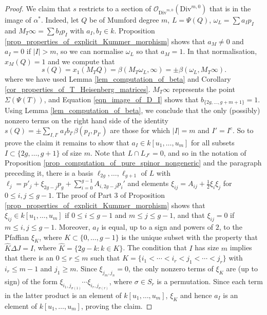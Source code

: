 \documentclass{article} %
\numberwithin{equation}{section}
\newcommand{\cO}{\mathcal{O}}
\begin{document}
\begin{proof}
We claim that $s$ restricts to a section of $\cO_{\mathrm{Div}^{m,0}}(\mathrm{Div}^{m,0})$ that is in the image of $\alpha^\ast$.
Indeed, let $Q$ be of Mumford degree $m$, $L = \Psi(Q)$,  $\omega_L = \sum a_I p_I$ and $M_T\infty = \sum b_I p_I$ with $a_I, b_I \in k$.
Proposition \ref{prop_properties_of_explicit_Kummer_morphism} shows that $a_M\neq0$ and $a_I=0$ if $|I|>m$, so we can normalise $\omega_L$ so that $a_M = 1$.
In that normalisation, $x_M(Q)=1$ and we compute that 
\[ s(Q) = x_1(M_TQ) = \beta(M_T\omega_L, \infty) = \pm \beta(\omega_L, M_T\infty). \]
where we have used Lemma \ref{lem_computation_of_beta} and Corollary \ref{cor_properties_of_T_Heisenberg_matrices}. $M_T  \infty$ represents the point $\Sigma(\Psi(T))$, and Equation \eqref{eqn_image_of_D_I} shows that $b_{\{2g, \dots, g+m+1\}}=1$.
Using Lemma \ref{lem_computation_of_beta}, we conclude that the only (possibly) nonzero terms on the right hand side of the identity
$s(Q) = \pm\sum_{I,I'} a_I b_{I'} \beta(p_I, p_{I'})$ are those for which $|I| = m$ and $I' = I^c$.
So to prove the claim it remains to show that $a_I \in k[u_1, \dots, u_m]$ for all subsets $I\subset \{2g, \dots, g+1\}$ of size $m$. 
Note that $L \cap L_{J^c} = 0$, and so in the notation of Proposition \ref{prop_computation_of_pure_spinor_nongeneric} and the paragraph preceding it, there is a basis $\ell_{2g}, \dots, \ell_{g+1}$ of $L$ with $\ell_j = p'_j + \xi_{2g-j} p_g + \sum_{i=0}^{g-1} A_{i ,2g-j} p_i'$ and elements $\xi_{ij} = A_{ij} +\frac{1}{2} \xi_i \xi_j$ for $0\leq i,j\leq g-1$.
The proof of Part  3 of Proposition \ref{prop_properties_of_explicit_Kummer_morphism} shows that $\xi_{ij}\in k[u_1, \dots, u_m]$ if $0\leq i \leq g-1$ and $m\leq j\leq g-1$, and that $\xi_{ij} =0$ if $m\leq i,j\leq g-1$. 
Moreover, $a_I$ is equal, up to a sign and powers of $2$, to the Pfaffian $\xi_{K}$, where $K\subset \{0, \dots, g-1\}$ is the unique subset with the property that $\widehat{K} \Delta J = I$, where $\widehat{K} = \{2g-k\colon k\in K\}$.
The condition that $I$ has size $m$ implies that there is an $0\leq r\leq m$ such that $K = \{i_1< \cdots < i_r < j_1 < \cdots <j_r\}$ with $i_r \leq m-1$ and $j_1\geq m$. 
Since $\xi_{j_m,j_n} = 0$, the only nonzero terms of $\xi_K$ are (up to sign) of the form $\xi_{i_1,j_{\sigma(1)}}\cdots \xi_{i_r, j_{\sigma(r)}}$, where $\sigma\in S_r$ is a permutation. Since each term in the latter product is an element of $k[u_1, \dots, u_m]$, $\xi_K$ and hence $a_I$ is an element of $k[u_1, \dots, u_m]$, proving the claim.


\end{proof}
\end{document}

